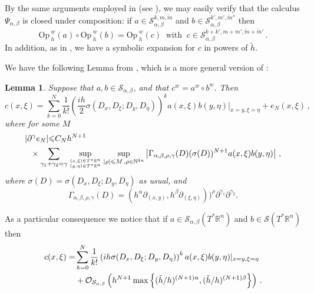 \documentclass[twoside, final]{amsart}
\newtheorem{lemma}[proposition]{Lemma}
\theoremstyle{definition}
\numberwithin{equation}{section}
\begin{document}
By the same arguments employed in \cite{SjZw-frac} (see \cite{ChWu-lsm}), we may easily
verify that the calculus $\Psi_{\alpha,\beta}$ is closed under composition: if
$ a \in   {{\mathcal S}}^{k,m , {\widetilde m} }_{\alpha,\beta}$ and
$ b \in   {{\mathcal S}}^{k',m', \widetilde m''}_{\alpha,\beta} $ then 
\[ {\mathrm{Op}\,}_h^w (a) \circ {\mathrm{Op}\,}_h^w(b) = {\mathrm{Op}\,}_h^w (c)
\ \text{ with } \ 
c \in   {{\mathcal S}}^{k+k',m +m', {\widetilde m}+ {\widetilde m}'  }_{\alpha,\beta}\,.
\]
In addition, as in \cite{ChWu-lsm}, we have a symbolic expansion for
$c$ in powers of $ \tilde h $. 

We have the following Lemma from \cite{ChWu-lsm}, which is a more
general version of \cite[Lemma 3.6]{SjZw-frac}:
\begin{lemma}
\label{l:err}
Suppose that 
$ a, b \in {{\mathcal S}}_{\alpha,\beta}$, 
and that $ c^w = a^w \circ b^w $. 
Then 
\begin{equation}
\label{eq:weylc}  c ( x, \xi) = \sum_{k=0}^N \frac{1}{k!} \left( 
\frac{i h}{2} \sigma ( D_x , D_\xi; D_y , D_\eta) \right)^k a ( x , \xi) 
b( y , \eta) |_{ x = y , \xi = \eta} + e_N ( x, \xi ) \,,
\end{equation}
where for some $ M $
\begin{equation}
\label{eq:new1}
\begin{split}
& | \partial^{\gamma} e_N | {\leqslant} C_N h^{N+1}
 \\
& \ \ 
\times \sum_{ \gamma_1 + \gamma_2 = \gamma } 
 \sup_{ 
{{( x, \xi) \in T^* {\mathbb{R}}^n }
\atop{ ( y , \eta) \in T^* {\mathbb{R}}^n }}} \sup_{
|\rho | {\leqslant} M  \,, \rho \in {{\mathbb N}}^{4n} }
\left|
\Gamma_{\alpha, \beta, \rho,\gamma }(D)
( \sigma ( D) ) ^{N+1} a ( x , \xi)  
b ( y, \eta ) 
\right| \,,
\end{split} 
\end{equation}
where $ \sigma ( D) = 
 \sigma ( D_x , D_\xi; D_y, D_\eta )  $ as usual,  
and 
\[
\Gamma_{\alpha, \beta, \rho,\gamma }(D) =( h^\alpha {{\partial}}_{(x,y)},
h^\beta {{\partial}}_{(\xi,\eta)}))^\rho \partial^{\gamma_1} 
\partial^{\gamma_2}.
\]
\end{lemma}

As a particular consequence we notice that if $ a \in 
{{\mathcal S}}_{\alpha,\beta} ( T^* {\mathbb{R}}^n)  $ and $ b \in  {{\mathcal S}} ( T^* {\mathbb{R}}^n ) $ then 
\begin{align}
\label{eq:abc}
  c ( x, \xi) = &
 \sum_{k=0}^N \frac{1}{k!} \left( 
i h \sigma ( D_x , D_\xi; D_y , D_\eta) \right)^k a ( x , \xi) 
b( y , \eta) |_{ x = y , \xi = \eta} \\
& + {\mathcal O}_{{{\mathcal S}}_{\alpha,\beta}}
\left( h^{N+1} \max \left\{ (\tilde{h}/h)^{(N+1) \alpha}, (\tilde{h}/h)^{(N+1) \beta} \right\} \right)
\,. \notag
\end{align}
\end{document}
